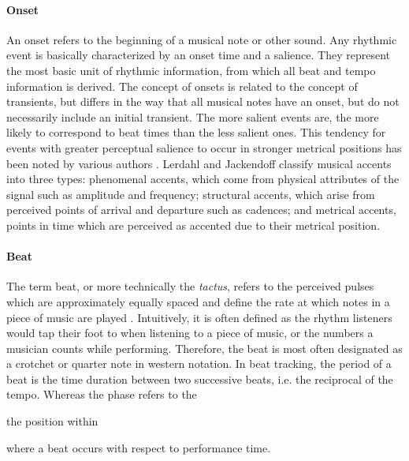 \documentclass{scrartcl}
\begin{document}
\paragraph{Onset} 
An onset refers to the beginning of a musical note or other sound. Any rhythmic event is basically characterized by an onset time and a salience. They represent the most basic unit of rhythmic information, from which all beat and tempo information is derived. The concept of onsets is related to the concept of transients, but differs in the way that all musical notes have an onset, but do not necessarily include an initial transient. The more salient events are, the more likely to correspond to beat times than the less salient ones. This tendency for events with greater perceptual salience to occur in stronger metrical positions has been noted by various authors \cite{Lerdahl1985,Povel1985,Parncutt1994}. Lerdahl and Jackendoff \cite{Lerdahl1985} classify musical accents into three types: phenomenal accents, which come from physical attributes of the signal such as amplitude and frequency; structural accents, which arise from perceived points of arrival and departure such as cadences; and metrical accents, points in time which are perceived as accented due to their metrical position.


\paragraph{Beat} 
The term beat, or more technically the \emph{tactus}, refers to the perceived pulses which are approximately equally spaced and define the rate at which notes in a piece of music are played \cite{Handel1989}. Intuitively, it is often defined as the rhythm listeners would tap their foot to when listening to a piece of music, or the numbers a musician counts while performing. Therefore, the beat is most often designated as a crotchet or quarter note in western notation. In beat tracking, the period of a beat is the time duration between two successive beats, i.e. the reciprocal of the tempo. Whereas the phase refers to the 

 the position within 


 where a beat occurs with respect to performance time.
\end{document}
